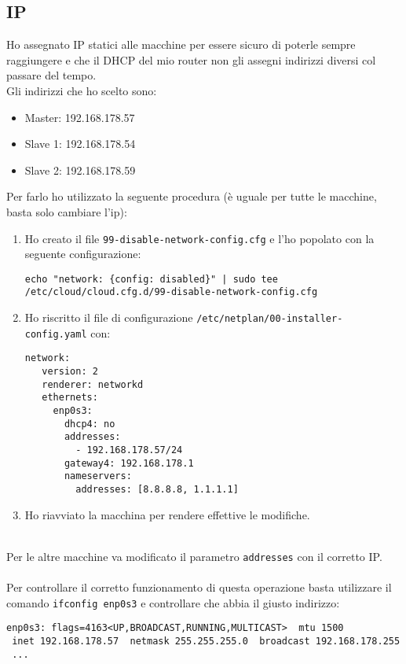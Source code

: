 \subsection{IP}

Ho assegnato IP statici alle macchine per essere sicuro di poterle sempre raggiungere e che
il DHCP del mio router non gli assegni indirizzi diversi col passare del tempo.\\
Gli indirizzi che ho scelto sono:
\begin{itemize}
	\item Master: 192.168.178.57
	\item Slave 1: 192.168.178.54
	\item Slave 2: 192.168.178.59
\end{itemize}
Per farlo ho utilizzato la seguente procedura (\`{e} uguale per tutte le macchine, basta solo cambiare l'ip):

\begin{enumerate}
	\item Ho creato il file \lstinline[style=cmd]|99-disable-network-config.cfg| e l'ho popolato con la seguente configurazione:
	
	\begin{lstlisting}[style=cmd]
 echo "network: {config: disabled}" | sudo tee /etc/cloud/cloud.cfg.d/99-disable-network-config.cfg
	\end{lstlisting}
	\item Ho riscritto il file di configurazione \lstinline[style=cmd]|/etc/netplan/00-installer-config.yaml| con:
	
	\begin{lstlisting}[style=cmd]
 network:
   version: 2
   renderer: networkd
   ethernets:
     enp0s3:
       dhcp4: no
       addresses:
         - 192.168.178.57/24
       gateway4: 192.168.178.1
       nameservers:
         addresses: [8.8.8.8, 1.1.1.1]
	\end{lstlisting}
	\item Ho riavviato la macchina per rendere effettive le modifiche.
\end{enumerate}
\ \\
Per le altre macchine va modificato il parametro \lstinline[style=cmd]|addresses| con il corretto IP.\\
\ \\
Per controllare il corretto funzionamento di questa operazione basta utilizzare il comando \lstinline[style=cmd]|ifconfig enp0s3| e controllare che abbia il giusto indirizzo:

\begin{lstlisting}[style=output]
 enp0s3: flags=4163<UP,BROADCAST,RUNNING,MULTICAST>  mtu 1500
 inet 192.168.178.57  netmask 255.255.255.0  broadcast 192.168.178.255
 ...
\end{lstlisting}
 
